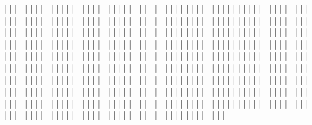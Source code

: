 |    |    |    |    |    |    |
|    |    |    |    |    |    |
|    |    |    |    |    |    |
|    |    |    |    |    |    |
|    |    |    |    |    |    |
|    |    |    |    |    |    |
|    |    |    |    |    |    |
|    |    |    |    |    |    |
|    |    |    |    |    |    |
|    |    |    |    |    |    |
|    |    |    |    |    |    |
|    |    |    |    |    |    |
|    |    |    |    |    |    |
|    |    |    |    |    |    |
|    |    |    |    |    |    |
|    |    |    |    |    |    |
|    |    |    |    |    |    |
|    |    |    |    |    |    |
|    |    |    |    |    |    |
|    |    |    |    |    |    |
|    |    |    |    |    |    |
|    |    |    |    |    |    |
|    |    |    |    |    |    |
|    |    |    |    |    |    |
|    |    |    |    |    |    |
|    |    |    |    |    |    |
|    |    |    |    |    |    |
|    |    |    |    |    |    |
|    |    |    |    |    |    |
|    |    |    |    |    |    |
|    |    |    |    |    |    |
|    |    |    |    |    |    |
|    |    |    |    |    |    |
|    |    |    |    |    |    |
|    |    |    |    |    |    |
|    |    |    |    |    |    |
|    |    |    |    |    |    |
|    |    |    |    |    |    |
|    |    |    |    |    |    |
|    |    |    |    |    |    |
|    |    |    |    |    |    |
|    |    |    |    |    |    |
|    |    |    |    |    |    |
|    |    |    |    |    |    |
|    |    |    |    |    |    |
|    |    |    |    |    |    |
|    |    |    |    |    |    |
|    |    |    |    |    |    |
|    |    |    |    |    |    |
|    |    |    |    |    |    |
|    |    |    |    |    |    |
|    |    |    |    |    |    |
|    |    |    |    |    |    |
|    |    |    |    |    |    |
|    |    |    |    |    |    |
|    |    |    |    |    |    |
|    |    |    |    |    |    |
|    |    |    |    |    |    |
|    |    |    |    |    |    |
|    |    |    |    |    |    |
|    |    |    |    |    |    |
|    |    |    |    |    |    |
|    |    |    |    |    |    |
|    |    |    |    |    |    |
|    |    |    |    |    |    |
|    |    |    |    |    |    |
|    |    |    |    |    |    |
|    |    |    |    |    |    |
|    |    |    |    |    |    |
|    |    |    |    |    |    |
|    |    |    |    |    |    |
|    |    |    |    |    |    |
|    |    |    |    |    |    |
|    |    |    |    |    |    |
|    |    |    |    |    |    |
|    |    |    |    |    |    |
|    |    |    |    |    |    |
|    |    |    |    |    |    |
|    |    |    |    |    |    |
|    |    |    |    |    |    |
|    |    |    |    |    |    |
|    |    |    |    |    |    |
